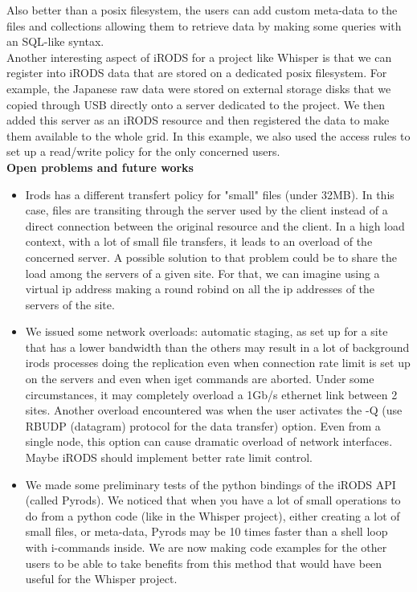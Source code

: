 \documentclass[a4paper, 10pt]{article}
\begin{document}
\begin{multicols}{2}
Also better than a posix filesystem, the users can add custom meta-data to the files and collections allowing them to retrieve data by making some queries with an SQL-like syntax. 
\\
Another interesting aspect of iRODS for a project like Whisper is that we can register into iRODS data that are stored on a dedicated posix filesystem. For example, the Japanese raw data were stored on external storage disks that we copied through USB directly onto a server dedicated to the project. We then added this server as an iRODS resource and then registered the data to make them available to the whole grid. In this example, we also used the access rules to set up a read/write policy for the only concerned users.
\\\textbf{Open problems and future works}
\\
\begin{itemize}
  \item Irods has a different transfert policy for "small" files (under 32MB). In this case, files are transiting through the server used by the client instead of a direct connection between the original resource and the client. In a high load context, with a lot of small file transfers, it leads to an overload of the concerned server. A possible solution to that problem could be to share the load among the servers of a given site. For that, we can imagine using a virtual ip address making a round robind on all the ip addresses of the servers of the site.
  \item We issued some network overloads: automatic staging, as set up for a site that has a lower bandwidth than the others may result in a lot of background irods processes doing the replication even when connection rate limit is set up on the servers and even when iget commands are aborted. Under some circumstances, it may completely overload a 1Gb/s ethernet link between 2 sites. Another overload encountered was when the user activates the -Q (use RBUDP (datagram) protocol for the data transfer) option. Even from a single node, this option can cause dramatic overload of network interfaces. Maybe iRODS should implement better rate limit control. 
  \item We made some preliminary tests of the python bindings of the iRODS API (called Pyrods). We noticed that when you have a lot of small operations to do from a python code (like in the Whisper project), either creating a lot of small files, or meta-data, Pyrods may be 10 times faster than a shell loop with i-commands inside. We are now making code examples for the other users to be able to take benefits from this method that would have been useful for the Whisper project.
\end{itemize}


\end{multicols}
\end{document}
